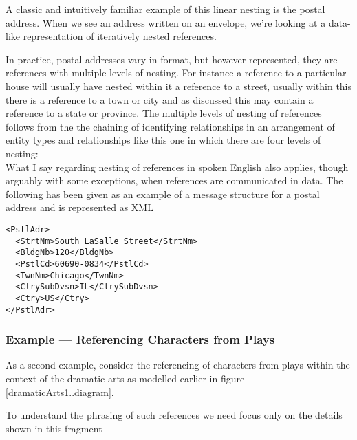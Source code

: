 A classic and intuitively familiar example of this linear nesting is the postal address. 
When we see an address written on an envelope, we’re looking at a data-like representation of iteratively nested references.

In practice, postal addresses vary in format, but however represented, they are references with multiple levels of nesting.
For instance a reference to a particular house will usually have nested within it a reference to a street, usually within this there is a reference to a town or city and
as discussed this may contain a reference to a state or province.  
The multiple levels of nesting of references follows from the
the chaining of identifying relationships in an arrangement
of entity types and relationships like this one in which there are four levels of nesting:
\begin{equation*}

\end{equation*}
\mynote
What I say regarding nesting of references in spoken English also applies, though arguably with some exceptions, when references are communicated in data.
The following has been given as an example of a message structure for a postal address and is represented as XML
\begin{verbatim}
<PstlAdr>
  <StrtNm>South LaSalle Street</StrtNm>
  <BldgNb>120</BldgNb>
  <PstlCd>60690-0834</PstlCd>
  <TwnNm>Chicago</TwnNm>
  <CtrySubDvsn>IL</CtrySubDvsn>
  <Ctry>US</Ctry>
</PstlAdr>
\end{verbatim}

\subsubsection{Example --- Referencing Characters from Plays}
\label{exampleReferencingCharacters}
\mynote
 As a second example, consider the referencing of characters from  plays
 within the context of  the  dramatic arts
  as modelled earlier in figure \ref{dramaticArts1..diagram}.

To understand the phrasing of such references we need focus only on the details shown in this fragment 
\begin{equation*}

\end{equation*}

